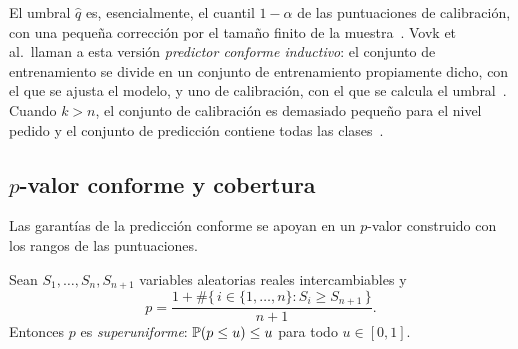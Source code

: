 El umbral $\hat q$ es, esencialmente, el cuantil $1-\alpha$ de las puntuaciones de
calibración, con una pequeña corrección por el tamaño
finito de la muestra~\cite{angelopoulos2021}. Vovk et al.\ llaman a esta versión
\emph{predictor conforme inductivo}: el conjunto de entrenamiento se divide en un
conjunto de entrenamiento propiamente dicho, con el que se ajusta el modelo, y uno
de calibración, con el que se calcula el umbral~\cite{vovk2022}. Cuando $k > n$, el
conjunto de calibración es demasiado pequeño para el nivel pedido y el conjunto
de predicción contiene todas las clases~\cite{angelopoulos2021}.

\subsection{\texorpdfstring{$p$}{p}-valor conforme y cobertura}\label{sec:conforme-cobertura}

Las garantías de la predicción conforme se apoyan en un $p$-valor construido con
los rangos de las puntuaciones.

\begin{proposicion}\label{prop:p-valor-conforme}
Sean $S_1,\dots,S_n,S_{n+1}$ variables aleatorias reales intercambiables y
\[
  p = \frac{1 + \#\{\, i \in \{1,\dots,n\} : S_i \ge S_{n+1} \,\}}{n+1}.
\]
Entonces $p$ es \emph{superuniforme}: $\mathbb{P}(p \le u) \le u$ para todo
$u \in [0,1]$.
\end{proposicion}

